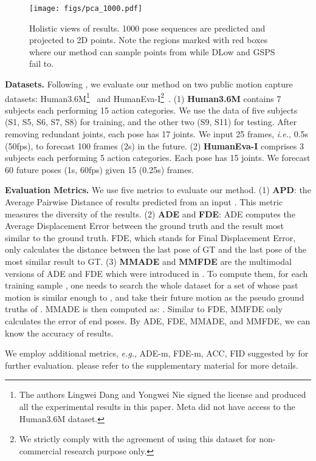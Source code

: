 \documentclass[sigconf,screen,nonacm]{acmart}
\begin{document}
	\begin{figure*}[!t]
		\centering
		\texttt{[image: figs/pca\_1000.pdf]}
		\caption{Holistic views of results. 1000 pose sequences are predicted and projected to 2D points. Note the regions marked with red boxes where our method can sample points from while DLow and GSPS fail to.}
		\label{fig:pca_diversity}
	\end{figure*}
	
\textbf{Datasets.} Following \cite{yuan2020dlow, mao2021generating}, we evaluate our method on two public motion capture datasets: Human3.6M\footnote{The authors Lingwei Dang and Yongwei Nie signed the license and produced all the experimental results in this paper. Meta did not have access to the Human3.6M dataset.}~\cite{ionescu2013human3} and HumanEva-I\footnote{We strictly comply with the agreement of using this dataset for non-commercial research purpose only.}~\cite{sigal2010humaneva}. (1) \textbf{Human3.6M} contains 7 subjects each performing 15 action categories. We use the data of five subjects (S1, S5, S6, S7, S8) for training, and the other two (S9, S11) for testing. After removing redundant joints, each pose has 17 joints. We input 25 frames, \textit{i.e.}, 0.5s (50fps), to forecast 100 frames (2s) in the future. (2) \textbf{HumanEva-I} comprises 3 subjects each performing 5 action categories. Each pose has 15 joints. We forecast 60 future poses (1s, 60fps) given 15 (0.25s) frames. 

	\textbf{Evaluation Metrics.} We use five metrics to evaluate our method. (1) \textbf{APD}: the Average Pairwise Distance of results predicted from an input \cite{aliakbarian2020stochastic}. This metric measures the diversity of the results. (2) \textbf{ADE} and \textbf{FDE}: ADE computes the Average Displacement Error between the ground truth and the result most similar to the ground truth. FDE, which stands for Final Displacement Error, only calculates the distance between the last pose of GT and the last pose of the most similar result to GT. (3) \textbf{MMADE} and \textbf{MMFDE} are the multimodal versions of ADE and FDE which were introduced in \cite{yuan2020dlow}. To compute them, for each training sample , one needs to search the whole dataset for a set of  whose past motion  is similar enough to , and take their future motion  as the pseudo ground truths of . MMADE is then computed as: . 
Similar to FDE, MMFDE only calculates the error of end poses. By ADE, FDE, MMADE, and MMFDE, we can know the accuracy of results.
	
We employ additional metrics, \textit{e.g.}, ADE-m, FDE-m, ACC, FID suggested by \cite{bie2022hit} for further evaluation. please refer to the supplementary material for more details.
	
\end{document}
